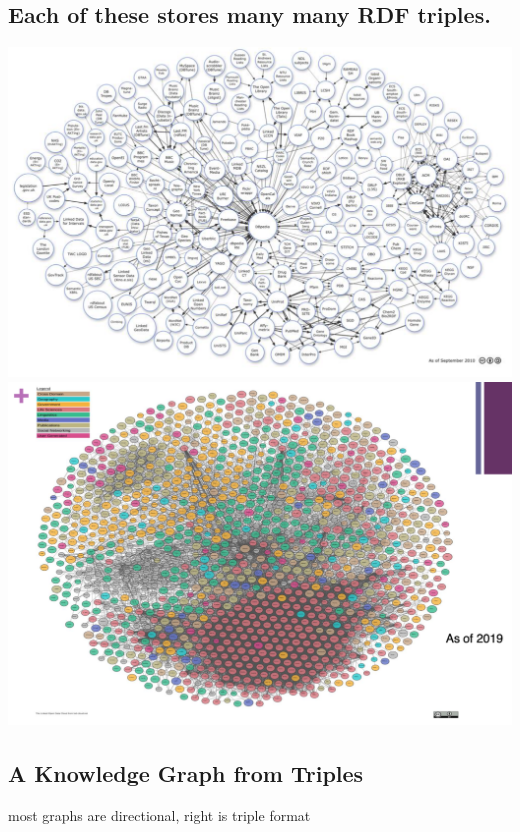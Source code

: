 \documentclass[11pt]{article}
\theoremstyle{definition}
\begin{document}
\subsection{Each of these stores many many RDF triples.}
\includegraphics[width=\textwidth/2-2.08049pt]{6.png}
\includegraphics[width=\textwidth/2]{7.png}

\subsection{A Knowledge Graph from Triples}

most graphs are directional, right is triple format
\end{document}
